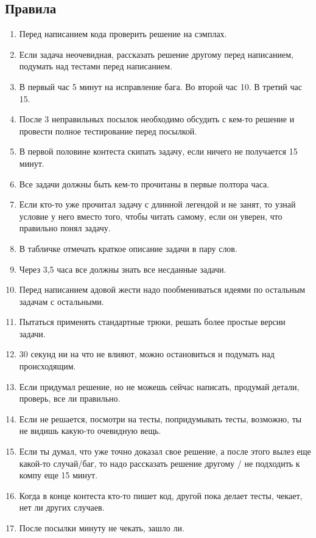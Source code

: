 \documentclass[14pt,fleqn]{article}
\begin{document}
\subsection{Правила}
\begin{enumerate}[topsep=0pt,itemsep=-1ex,partopsep=1ex,parsep=1ex]
	\item Перед написанием кода проверить решение на сэмплах.
	\item Если задача неочевидная, рассказать решение другому перед написанием, подумать над тестами перед написанием.
	\item В первый час 5 минут на исправление бага. Во второй час 10. В третий час 15.
	\item После 3 неправильных посылок необходимо обсудить с кем-то решение и провести полное тестирование
	перед посылкой.
	\item В первой половине контеста скипать задачу, если
	ничего не получается 15 минут.
	\item Все задачи должны быть кем-то прочитаны в первые полтора часа.
	\item Если кто-то уже прочитал задачу с длинной легендой и не занят, то узнай условие у него вместо того,
	чтобы читать самому, если он уверен, что правильно понял задачу.
	\item В табличке отмечать краткое описание задачи в
	пару слов.
	\item Через 3,5 часа все должны знать все несданные
	задачи.
	\item Перед написанием адовой жести надо пообмениваться идеями по остальным задачам с остальными.
	\item Пытаться применять стандартные трюки, решать
	более простые версии задачи.
	\item 30 секунд ни на что не влияют, можно остановиться и подумать над происходящим.
	\item Если придумал решение, но не можешь сейчас
	написать, продумай детали, проверь, все ли правильно.
	\item Если не решается, посмотри на тесты, попридумывать тесты, возможно, ты не видишь какую-то очевидную вещь.
	\item Если ты думал, что уже точно доказал свое решение, а после этого вылез еще какой-то случай/баг, то
	надо рассказать решение другому / не подходить к компу еще 15 минут.
	\item Когда в конце контеста кто-то пишет код, другой
	пока делает тесты, чекает, нет ли других случаев.
	\item После посылки минуту не чекать, зашло ли.
\end{enumerate}
\end{document}
